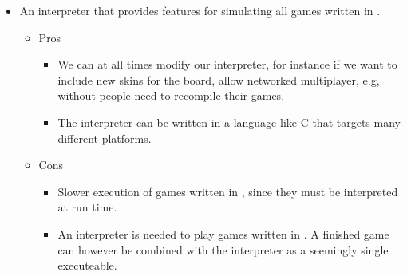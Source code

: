 \begin{itemize}
\begin{itemize}
\begin{itemize}
		\end{itemize}
	\end{itemize}
\item An interpreter that provides features for simulating all games written in \productname{}.
	\begin{itemize}
	\item Pros
		\begin{itemize}
		\item We can at all times modify our interpreter, for instance if we want to include new skins for the board, allow networked multiplayer, e.g, without people need to recompile their games. 
		\item The interpreter can be written in a language like C that targets many different platforms.
		\end{itemize}
	\item Cons
		\begin{itemize}
		\item Slower execution of games written in \productname{}, since they must be interpreted at run time.
		\item An interpreter is needed to play games written in \productname{}. A finished game can however be combined with the interpreter as a seemingly single executeable.
		\end{itemize}
	\end{itemize}
\end{itemize}